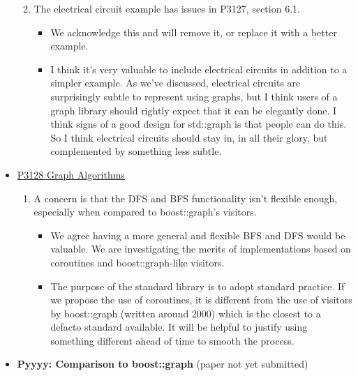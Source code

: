 \begin{itemize}
\begin{enumerate}
\begin{itemize}
                        \end{itemize}
                  \item The electrical circuit example has issues in P3127, section 6.1.
                        \begin{itemize}
                              \item We acknowledge this and will remove it, or replace it with a better example.
                              \item I think it's very valuable to include electrical circuits in addition to a simpler example. As we've discussed, electrical 
                                    circuits are surprisingly subtle to represent using graphs, but I think users of a graph library should rightly expect that 
                                    it can be elegantly done. I think signs of a good design for std::graph is that people can do this. So I think electrical 
                                    circuits should stay in, in all their glory, but complemented by something less subtle. 
                        \end{itemize}
      \end{enumerate}
      \item \href{https://www.wg21.link/P3128}{P3128 Graph Algorithms}
            \begin{enumerate}
                  \item A concern is that the DFS and BFS functionality isn't flexible enough, especially when compared to boost::graph's visitors.
                        \begin{itemize}
                              \item We agree having a more general and flexible BFS and DFS would be valuable. We are investigating the merits 
                                    of implementations based on coroutines and boost::graph-like visitors.
                              \item The purpose of the standard library is to adopt standard practice. If we propose the use of coroutines, it is different 
                                    from the use of visitors by boost::graph (written around 2000) which is the closest to a defacto standard available. 
                                    It will be helpful to justify using something different ahead of time to smooth the process.
                        \end{itemize}
            \end{enumerate}
      \item \textbf{Pyyyy: Comparison to boost::graph} (paper not yet submitted)

\end{itemize}
